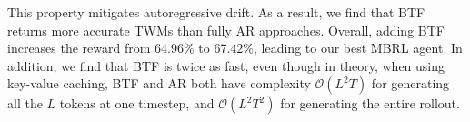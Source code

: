 This property mitigates autoregressive drift. As a result, we find that BTF returns more accurate TWMs than fully AR approaches.
Overall, adding BTF increases the reward from $64.96\%$ to $67.42\%$, leading to our best MBRL agent.
In addition, we find that BTF is twice as fast,
even though in theory,
when using key-value caching, BTF and AR both have complexity $\mathcal{O}(L^2 T)$ for generating all the $L$ tokens at one timestep, and $\mathcal{O}(L^2 T^2)$ for generating the entire rollout.


